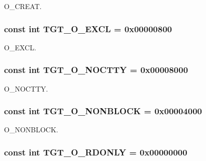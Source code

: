 O\_\-CREAT. \hypertarget{classSparcLinux_a10d5d118d15b51ebdd4b16dc78342d1d}{
\subsubsection[{TGT\_\-O\_\-EXCL}]{\setlength{\rightskip}{0pt plus 5cm}const int {\bf TGT\_\-O\_\-EXCL} = 0x00000800}}
\label{classSparcLinux_a10d5d118d15b51ebdd4b16dc78342d1d}


O\_\-EXCL. \hypertarget{classSparcLinux_adfd4240281579e5f60c5e22c601225d8}{
\subsubsection[{TGT\_\-O\_\-NOCTTY}]{\setlength{\rightskip}{0pt plus 5cm}const int {\bf TGT\_\-O\_\-NOCTTY} = 0x00008000}}
\label{classSparcLinux_adfd4240281579e5f60c5e22c601225d8}


O\_\-NOCTTY. \hypertarget{classSparcLinux_a0ea5420b4c9b45ba342a266fb77ac942}{
\subsubsection[{TGT\_\-O\_\-NONBLOCK}]{\setlength{\rightskip}{0pt plus 5cm}const int {\bf TGT\_\-O\_\-NONBLOCK} = 0x00004000}}
\label{classSparcLinux_a0ea5420b4c9b45ba342a266fb77ac942}


O\_\-NONBLOCK. \hypertarget{classSparcLinux_ad266b23a0ae07d1833e18bae651f3411}{
\subsubsection[{TGT\_\-O\_\-RDONLY}]{\setlength{\rightskip}{0pt plus 5cm}const int {\bf TGT\_\-O\_\-RDONLY} = 0x00000000}}
\label{classSparcLinux_ad266b23a0ae07d1833e18bae651f3411}


